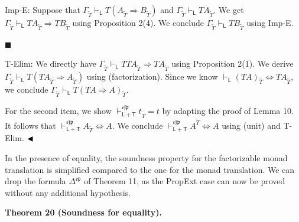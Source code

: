 \documentclass[10pt,a4paper]{article}
\begin{document}
Imp-E: Suppose that $\Gamma_{\widetilde{T}}\vdash_{\mathsf{L}}T(A_{\widetilde{T}}\mathbin{\Rightarrow}B_{\widetilde{T}})$ and $\Gamma_{\widetilde{T}}\vdash_{\mathsf{L}}TA_{\widetilde{T}}$. We get $\Gamma_{\widetilde{T}}\vdash_{\mathsf{L}}TA_{\widetilde{T}}\mathbin{\Rightarrow}TB_{\widetilde{T}}$ using Proposition 2(4). We conclude $\Gamma_{\widetilde{T}}\vdash_{\mathsf{L}}TB_{\widetilde{T}}$ using Imp-E.\par
 
 
 
\par\noindent  $\blacksquare$ 
 
T-Elim: We directly have $\Gamma_{\widetilde{T}}\vdash_{\mathsf{L}}TTA_{\widetilde{T}}\mathbin{\Rightarrow}TA_{\widetilde{T}}$ using Proposition 2(1). We derive $\Gamma_{\widetilde{T}}\vdash_{\mathsf{L}}T(TA_{\widetilde{T}}\mathbin{\Rightarrow}A_{\widetilde{T}})$ using (factorization). Since we know $\vdash_{\mathsf{L}}(TA)_{\widetilde{T}}\Leftrightarrow TA_{\widetilde{T}}$, we conclude $\Gamma_{\widetilde{T}}\vdash_{\mathsf{L}}T(TA\mathbin{\Rightarrow}A)_{\widetilde{T}}$.\par
 
 
  
For the second item, we show $\vdash_{\mathsf{L}+\mathsf{T}}^{\mathfrak{e}\mathfrak{f}\mathfrak{p}}t_{\widetilde{T}}=t$ by adapting the proof of Lemma 10. It follows that $\vdash_{\mathsf{L}+\mathsf{T}}^{\mathfrak{e}\mathfrak{f}\mathfrak{p}}A_{\widetilde{T}}\Leftrightarrow A$. We conclude $\vdash_{\mathsf{L}+\mathsf{T}}^{\mathfrak{e}\mathfrak{f}\mathfrak{p}}A^{\widetilde{T}}\Leftrightarrow A$ using (unit) and T-Elim. $\hfill\blacktriangleleft$\par
 
 
 
In the presence of equality, the soundness property for the factorizable monad translation is simplified compared to the one for the monad translation. We can drop the formula $\Delta^{\mathfrak{e}\mathfrak{p}}$ of Theorem 11, as the PropExt case can now be proved without any additional hypothesis.\par
 
 
 
\par\medskip\noindent\textbf{Theorem 20 (Soundness for equality).}\par
 
\end{document}
